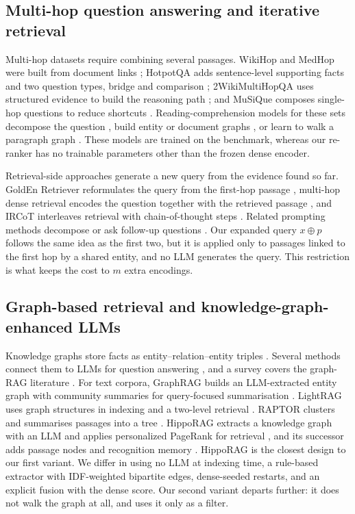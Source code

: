 \documentclass[a4paper,fleqn]{cas-sc}
\begin{document}
\subsection{Multi-hop question answering and iterative retrieval}
Multi-hop datasets require combining several passages. WikiHop and MedHop were built from document links \citep{welbl2018qangaroo}; HotpotQA adds sentence-level supporting facts and two question types, bridge and comparison \citep{yang2018hotpotqa}; 2WikiMultiHopQA uses structured evidence to build the reasoning path \citep{ho2020twowiki}; and MuSiQue composes single-hop questions to reduce shortcuts \citep{trivedi2022musique}. Reading-comprehension models for these sets decompose the question \citep{min2019decomp}, build entity or document graphs \citep{decao2019entitygcn,ding2019cogqa,tu2020sae,fang2020hgn}, or learn to walk a paragraph graph \citep{asai2020graphretriever}. These models are trained on the benchmark, whereas our re-ranker has no trainable parameters other than the frozen dense encoder.

Retrieval-side approaches generate a new query from the evidence found so far. GoldEn Retriever reformulates the query from the first-hop passage \citep{qi2019golden}, multi-hop dense retrieval encodes the question together with the retrieved passage \citep{xiong2021mdr}, and IRCoT interleaves retrieval with chain-of-thought steps \citep{trivedi2023ircot}. Related prompting methods decompose or ask follow-up questions \citep{press2023selfask,khot2023decomposed,wei2022cot,yao2023react}. Our expanded query $x\oplus p$ follows the same idea as the first two, but it is applied only to passages linked to the first hop by a shared entity, and no LLM generates the query. This restriction is what keeps the cost to $m$ extra encodings.

\subsection{Graph-based retrieval and knowledge-graph-enhanced LLMs}
Knowledge graphs store facts as entity--relation--entity triples \citep{hogan2021kg,ji2022kgsurvey}. Several methods connect them to LLMs for question answering \citep{yasunaga2021qagnn,sun2024tog,he2024gretriever}, and a survey covers the graph-RAG literature \citep{peng2024graphragsurvey}. For text corpora, GraphRAG builds an LLM-extracted entity graph with community summaries for query-focused summarisation \citep{edge2024graphrag}. LightRAG uses graph structures in indexing and a two-level retrieval \citep{guo2024lightrag}. RAPTOR clusters and summarises passages into a tree \citep{sarthi2024raptor}. HippoRAG extracts a knowledge graph with an LLM and applies personalized PageRank for retrieval \citep{gutierrez2024hipporag}, and its successor adds passage nodes and recognition memory \citep{gutierrez2025hipporag2}. HippoRAG is the closest design to our first variant. We differ in using no LLM at indexing time, a rule-based extractor with IDF-weighted bipartite edges, dense-seeded restarts, and an explicit fusion with the dense score. Our second variant departs further: it does not walk the graph at all, and uses it only as a filter.
\end{document}
